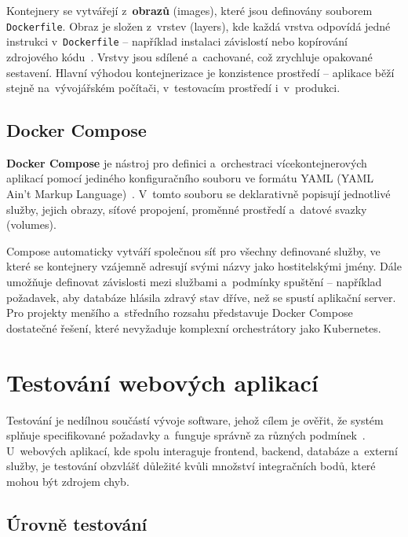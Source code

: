 \begin{sloppypar}
Kontejnery se vytvářejí z~\textbf{obrazů} (images), které jsou definovány souborem \texttt{Dockerfile}. Obraz je složen z~vrstev (layers), kde každá vrstva odpovídá jedné instrukci v~\texttt{Dockerfile} -- například instalaci závislostí nebo kopírování zdrojového kódu~\cite{docker2024overview}. Vrstvy jsou sdílené a~cachované, což zrychluje opakované sestavení. Hlavní výhodou kontejnerizace je konzistence prostředí -- aplikace běží stejně na~vývojářském počítači, v~testovacím prostředí i~v~produkci.
\end{sloppypar}

\subsection{Docker Compose}

\textbf{Docker Compose} je nástroj pro definici a~orchestraci vícekontejnerových aplikací pomocí jediného konfiguračního souboru ve formátu YAML (YAML Ain't Markup Language)~\cite{docker2024overview}. V~tomto souboru se deklarativně popisují jednotlivé služby, jejich obrazy, síťové propojení, proměnné prostředí a~datové svazky (volumes).

Compose automaticky vytváří společnou síť pro všechny definované služby, ve které se kontejnery vzájemně adresují svými názvy jako hostitelskými jmény. Dále umožňuje definovat závislosti mezi službami a~podmínky spuštění -- například požadavek, aby databáze hlásila zdravý stav dříve, než se spustí aplikační server. Pro projekty menšího a~středního rozsahu představuje Docker Compose dostatečné řešení, které nevyžaduje komplexní orchestrátory jako Kubernetes.

\section{Testování webových aplikací}

Testování je nedílnou součástí vývoje software, jehož cílem je ověřit, že systém splňuje specifikované požadavky a~funguje správně za různých podmínek~\cite{sommerville2016se}. U~webových aplikací, kde spolu interaguje frontend, backend, databáze a~externí služby, je testování obzvlášť důležité kvůli množství integračních bodů, které mohou být zdrojem chyb.

\subsection{Úrovně testování}

